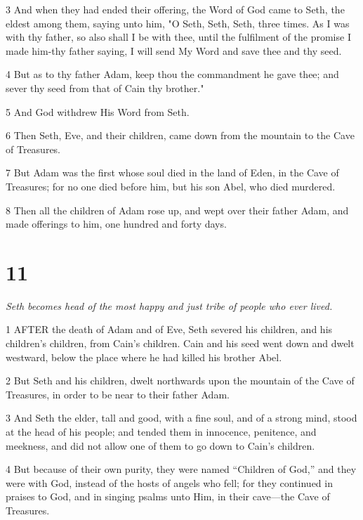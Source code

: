 \par 3 And when they had ended their offering, the Word of God came to Seth, the eldest among them, saying unto him, "O Seth, Seth, Seth, three times. As I was with thy father, so also shall I be with thee, until the fulfilment of the promise I made him-thy father saying, I will send My Word and save thee and thy seed.

\par 4 But as to thy father Adam, keep thou the commandment he gave thee; and sever thy seed from that of Cain thy brother."

\par 5 And God withdrew His Word from Seth.

\par 6 Then Seth, Eve, and their children, came down from the mountain to the Cave of Treasures.

\par 7 But Adam was the first whose soul died in the land of Eden, in the Cave of Treasures; for no one died before him, but his son Abel, who died murdered.

\par 8 Then all the children of Adam rose up, and wept over their father Adam, and made offerings to him, one hundred and forty days.

\chapter{11}

\par \textit{Seth becomes head of the most happy and just tribe of people who ever lived.}

\par 1 AFTER the death of Adam and of Eve, Seth severed his children, and his children's children, from Cain's children. Cain and his seed went down and dwelt westward, below the place where he had killed his brother Abel.

\par 2 But Seth and his children, dwelt northwards upon the mountain of the Cave of Treasures, in order to be near to their father Adam.

\par 3 And Seth the elder, tall and good, with a fine soul, and of a strong mind, stood at the head of his people; and tended them in innocence, penitence, and meekness, and did not allow one of them to go down to Cain's children.

\par 4 But because of their own purity, they were named “Children of God,” and they were with God, instead of the hosts of angels who fell; for they continued in praises to God, and in singing psalms unto Him, in their cave—the Cave of Treasures.

